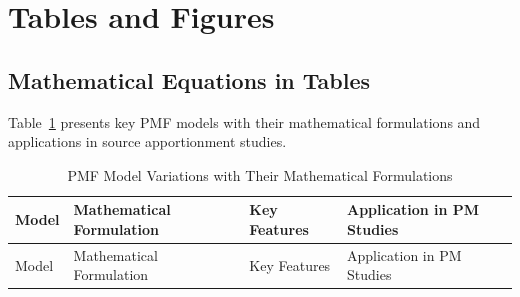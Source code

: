 \documentclass[
  letterpaper,
  oneside,
  openany]{MastersDoctoralThesis}
\theoremstyle{plain}
\theoremstyle{remark}
\begin{document}
\section{Tables and Figures}\label{sec-ch1-tables}

\subsection{Mathematical Equations in Tables}\label{sec-ch1-math-tables}

Table~\ref{tbl-ch1-pmf-models} presents key PMF models with their
mathematical formulations and applications in source apportionment
studies.

\begin{longtable}[]{@{}
  >{\raggedright\arraybackslash}p{}
  >{\raggedright\arraybackslash}p{}
  >{\raggedright\arraybackslash}p{}
  >{\raggedright\arraybackslash}p{}@{}}
\caption{PMF Model Variations with Their Mathematical
Formulations}\label{tbl-ch1-pmf-models}\tabularnewline
\toprule\noalign{}
\begin{minipage}[b]{\linewidth}\raggedright
Model
\end{minipage} & \begin{minipage}[b]{\linewidth}\raggedright
Mathematical Formulation
\end{minipage} & \begin{minipage}[b]{\linewidth}\raggedright
Key Features
\end{minipage} & \begin{minipage}[b]{\linewidth}\raggedright
Application in PM Studies
\end{minipage} \\
\midrule\noalign{}
\endfirsthead
\toprule\noalign{}
\begin{minipage}[b]{\linewidth}\raggedright
Model
\end{minipage} & \begin{minipage}[b]{\linewidth}\raggedright
Mathematical Formulation
\end{minipage} & \begin{minipage}[b]{\linewidth}\raggedright
Key Features
\end{minipage} & \begin{minipage}[b]{\linewidth}\raggedright
Application in PM Studies
\end{minipage} \\

\end{longtable}
\end{document}

